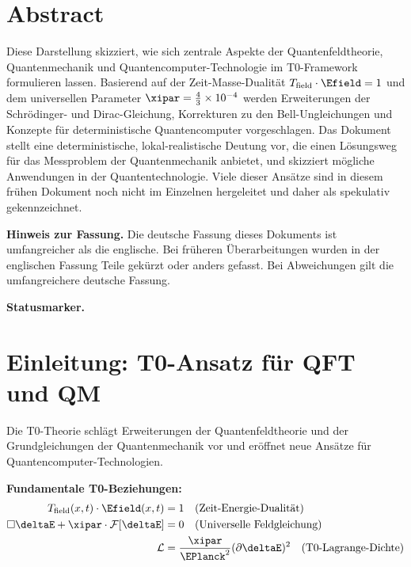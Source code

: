 \section*{Abstract}
		Diese Darstellung skizziert, wie sich zentrale Aspekte der Quantenfeldtheorie, Quantenmechanik und Quantencomputer-Technologie im T0-Framework formulieren lassen. Basierend auf der Zeit-Masse-Dualität $T_{\text{field}} \cdot \Efield = 1$ und dem universellen Parameter $\xipar = \frac{4}{3} \times 10^{-4}$ werden Erweiterungen der Schrödinger- und Dirac-Gleichung, Korrekturen zu den Bell-Ungleichungen und Konzepte für deterministische Quantencomputer vorgeschlagen. Das Dokument stellt eine deterministische, lokal-realistische Deutung vor, die einen Lösungsweg für das Messproblem der Quantenmechanik anbietet, und skizziert mögliche Anwendungen in der Quantentechnologie. Viele dieser Ansätze sind in diesem frühen Dokument noch nicht im Einzelnen hergeleitet und daher als spekulativ gekennzeichnet.

	\medskip\noindent\textbf{Hinweis zur Fassung.} Die deutsche Fassung dieses Dokuments ist umfangreicher als die englische. Bei früheren Überarbeitungen wurden in der englischen Fassung Teile gekürzt oder anders gefasst. Bei Abweichungen gilt die umfangreichere deutsche Fassung.


	\medskip\noindent\textbf{Statusmarker.}
	

	
	
	\section{Einleitung: T0-Ansatz für QFT und QM}
	
	Die T0-Theorie schlägt Erweiterungen der Quantenfeldtheorie und der Grundgleichungen der Quantenmechanik vor und eröffnet neue Ansätze für Quantencomputer-Technologien.
	
	\begin{tcolorbox}[colback=blue!5!white,colframe=blue!75!black,title=T0-Grundprinzipien für QFT und QM]
		\textbf{Fundamentale T0-Beziehungen:}
		\begin{align}
			T_{\text{field}}(x,t) \cdot \Efield(x,t) &= 1 \quad \text{(Zeit-Energie-Dualität)} \\
			\square \deltaE + \xipar \cdot \mathcal{F}[\deltaE] &= 0 \quad \text{(Universelle Feldgleichung)} \\
			\mathcal{L} &= \frac{\xipar}{\EPlanck^2} (\partial \deltaE)^2 \quad \text{(T0-Lagrange-Dichte)}
		\end{align}
	\end{tcolorbox}
	
